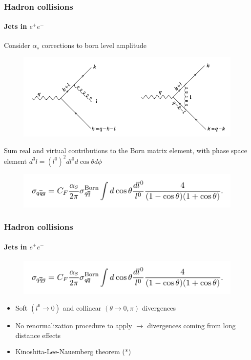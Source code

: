 \documentclass[aspectratio=43]{beamer}
\begin{document}
\begin{frame}

	\frametitle{Hadron collisions}
	\framesubtitle{Jets in $e^{+}e^{-}$}
	
	Consider $\alpha_{s}$ corrections to born level amplitude
	
	\begin{figure}
		\includegraphics[width = 7 cm]{plots/qcd_corrections_2.png}
	\end{figure}
	
	Sum real and virtual contributions to the Born matrix element, with phase space element $d^{3}l = (l^{0})^{2} dl^{0} d\cos\theta d\phi$
	\begin{figure}
		\includegraphics[width = 9 cm]{plots/eq_qqbg.png}
	\end{figure}

\end{frame}

\begin{frame}

	\frametitle{Hadron collisions}
	\framesubtitle{Jets in $e^{+}e^{-}$}
	
	\begin{figure}
		\includegraphics[width = 9 cm]{plots/eq_qqbg.png}
	\end{figure}

	\begin{itemize}
		\item Soft $(l^{0} \rightarrow 0)$ and collinear $(\theta \rightarrow 0, \pi)$ divergences
		\item No renormalization procedure to apply $\rightarrow$ divergences coming from long distance effects
		\item Kinoshita-Lee-Nauemberg theorem {\color{blue}(*)}
	\end{itemize}

\end{frame}
\end{document}
